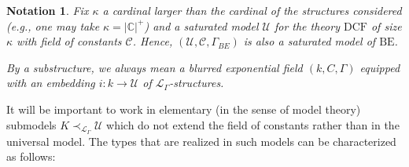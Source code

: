\documentclass[12pt]{amsart}
\newcommand{\DCF}{\mathrm{DCF}}
\newcommand{\BE}{\mathrm{BE}}
\theoremstyle{definition}
\theoremstyle{plain}
\newtheorem{notation}[defn]{Notation}
\theoremstyle{exampstyle}\newtheorem{thmx}{Theorem}
\theoremstyle{exampstyle}\newtheorem{thmxbis}{Theorem}
\begin{document}
\begin{notation} \label{notation-universal}
Fix $\kappa$ a cardinal larger than the cardinal of the structures considered (e.g., one may take $\kappa = \lvert \mathbb{C} \rvert ^+$) and a saturated model $\mathcal U$ for the theory $\DCF$ of size $\kappa$ with field of constants $\mathcal C$. Hence, $(\mathcal U, \mathcal C, \Gamma_{BE})$ is also a saturated model of $\BE$.


\noindent By a substructure, we always mean a blurred exponential field $(k,C,\Gamma)$ equipped with an embedding  $i: k \rightarrow \mathcal U$ of $\mathcal L_\Gamma$-structures.
\end{notation}

It will be important to work in elementary (in the sense of model theory) submodels $K \prec_{\mathcal L_{\Gamma}} \mathcal U$ which do not extend the field of constants rather than in the universal model. The types that are realized in such models can be characterized as follows: 
\end{document}
